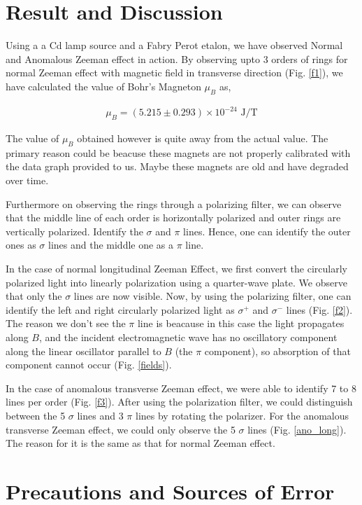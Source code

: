 \section{Result and Discussion}
Using a a Cd lamp source and a Fabry Perot etalon, we have observed Normal and Anomalous Zeeman effect in action. By observing upto 3 orders of rings for normal Zeeman effect with magnetic field in transverse direction (Fig. \ref{f1}), we have calculated the value of Bohr's Magneton $\mu_B$ as,

\begin{align*}
    \mu_B = (5.215 \pm 0.293) \times 10^{-24} \text{ J/T}
\end{align*}

The value of $\mu_B$ obtained however is quite away from the actual value. The primary reason could be beacuse these magnets are not properly calibrated with the data graph
provided to us. Maybe these magnets are old and
have degraded over time. 

Furthermore on observing the rings through a polarizing filter, we can observe that the middle line of each order is horizontally
polarized and outer rings are vertically polarized. Identify the $\sigma$ and $\pi$ lines. 
Hence, one can identify the outer ones as $\sigma$ lines and the middle one as a $\pi$ line.

In the case of normal longitudinal Zeeman Effect, we first convert the circularly polarized light into linearly polarization using a quarter-wave plate. We observe that only the $\sigma$ lines are now visible. Now, by using the polarizing filter, one can identify the left and right circularly polarized light as $\sigma^+$ and $\sigma^-$ lines (Fig. \ref{f2}). The reason we don't see the $\pi$ line is beacause in this case the light propagates along $B$, and the incident electromagnetic wave has no oscillatory component along the linear
oscillator parallel to $B$ (the $\pi$ component), so absorption of that component cannot occur (Fig. \ref{fields}).

In the case of anomalous transverse Zeeman effect, we were able to identify 7 to 8 lines per order (Fig. \ref{f3}). After using the polarization filter, we could distinguish between the 5 $\sigma$ lines and 3 $\pi$ lines by rotating the polarizer. For the anomalous transverse Zeeman effect, we could only observe the 5 $\sigma$ lines (Fig. \ref{ano_long}). The reason for it is the same as that for normal Zeeman effect.

\section{Precautions and Sources of Error}

